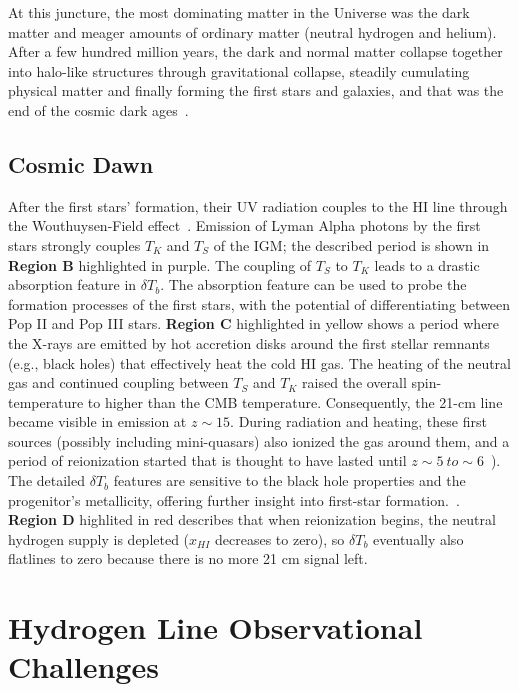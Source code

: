 	At this juncture, the most dominating matter in the Universe was the dark matter and meager amounts of ordinary matter (neutral hydrogen and helium). After a few hundred million years, the dark and normal matter collapse together into halo-like structures through gravitational collapse, steadily cumulating physical matter and finally forming the first stars and galaxies, and that was the end of the cosmic dark ages~\citep{2003Sci...300.1904M}.
		
	\subsection{Cosmic Dawn}
	    
	    After the first stars' formation, their UV radiation couples to the HI line through the Wouthuysen-Field effect~\citep{2012RPPh...75h6901P}. Emission of Lyman Alpha photons by the first stars strongly couples $T_K$ and $T_S$ of the IGM; the described period is shown in \textbf{Region B} highlighted in purple. The coupling of $T_S$ to $T_K$ leads to a drastic absorption feature in $\delta T_b$. The absorption feature can be used to probe the formation processes of the first stars, with the potential of differentiating between Pop II and Pop III stars. \textbf{Region C} highlighted in yellow shows a period where the X-rays are emitted by hot accretion disks around the first stellar remnants (e.g., black holes) that effectively heat the cold HI gas. The heating of the neutral gas and continued coupling between $T_S$ and $T_K$ raised the overall spin-temperature to higher than the CMB temperature. Consequently, the 21-cm line became visible in emission at $z\sim15$. During radiation and heating, these first sources (possibly including mini-quasars) also ionized the gas around them, and a period of reionization started that is thought to have lasted until $z\sim5~to\sim 6$~\citep{2015aska.confE...1K}). The detailed $\delta T_b$ features are sensitive to the black hole properties and the progenitor's metallicity, offering further insight into first-star formation.~\citep{11}. \textbf{Region D} highlited in red describes that when reionization begins, the neutral hydrogen supply is depleted ($x_{HI}$ decreases to zero), so $\delta T_b$ eventually also flatlines to zero because there is no more 21 cm signal left. 
	    
	    \section{Hydrogen Line Observational Challenges}
	    
